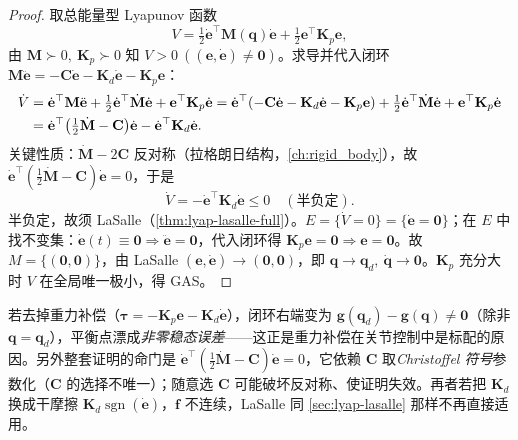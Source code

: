 \begin{proof}
取总能量型 Lyapunov 函数
\begin{equation}
  V=\tfrac12\dot{\mathbf{e}}^\top\mathbf{M}(\mathbf{q})\dot{\mathbf{e}}+\tfrac12\mathbf{e}^\top\mathbf{K}_p\mathbf{e},
  \label{eq:lyap-pd-V}
\end{equation}
由 $\mathbf{M}\succ0,\ \mathbf{K}_p\succ0$ 知 $V>0\ ((\mathbf{e},\dot{\mathbf{e}})\neq\mathbf{0})$。求导并代入闭环 $\mathbf{M}\ddot{\mathbf{e}}=-\mathbf{C}\dot{\mathbf{e}}-\mathbf{K}_d\dot{\mathbf{e}}-\mathbf{K}_p\mathbf{e}$：
\begin{align}
  \dot V&=\dot{\mathbf{e}}^\top\mathbf{M}\ddot{\mathbf{e}}+\tfrac12\dot{\mathbf{e}}^\top\dot{\mathbf{M}}\dot{\mathbf{e}}+\mathbf{e}^\top\mathbf{K}_p\dot{\mathbf{e}}
   =\dot{\mathbf{e}}^\top(-\mathbf{C}\dot{\mathbf{e}}-\mathbf{K}_d\dot{\mathbf{e}}-\mathbf{K}_p\mathbf{e})+\tfrac12\dot{\mathbf{e}}^\top\dot{\mathbf{M}}\dot{\mathbf{e}}+\mathbf{e}^\top\mathbf{K}_p\dot{\mathbf{e}}\notag\\
  &=\dot{\mathbf{e}}^\top\big(\tfrac12\dot{\mathbf{M}}-\mathbf{C}\big)\dot{\mathbf{e}}-\dot{\mathbf{e}}^\top\mathbf{K}_d\dot{\mathbf{e}}.
  \label{eq:lyap-pd-Vdot}
\end{align}
关键性质：$\dot{\mathbf{M}}-2\mathbf{C}$ 反对称（拉格朗日结构，\cref{ch:rigid_body}），故 $\dot{\mathbf{e}}^\top(\tfrac12\dot{\mathbf{M}}-\mathbf{C})\dot{\mathbf{e}}=0$，于是
\begin{equation}
  \dot V=-\dot{\mathbf{e}}^\top\mathbf{K}_d\dot{\mathbf{e}}\le0\quad(\text{半负定}).
  \label{eq:lyap-pd-Vdot-final}
\end{equation}
半负定，故须 LaSalle（\cref{thm:lyap-lasalle-full}）。$E=\{\dot V=0\}=\{\dot{\mathbf{e}}=\mathbf{0}\}$；在 $E$ 中找不变集：$\dot{\mathbf{e}}(t)\equiv\mathbf{0}\Rightarrow\ddot{\mathbf{e}}=\mathbf{0}$，代入闭环得 $\mathbf{K}_p\mathbf{e}=\mathbf{0}\Rightarrow\mathbf{e}=\mathbf{0}$。故 $M=\{(\mathbf{0},\mathbf{0})\}$，由 LaSalle $(\mathbf{e},\dot{\mathbf{e}})\to(\mathbf{0},\mathbf{0})$，即 $\mathbf{q}\to\mathbf{q}_d,\ \dot{\mathbf{q}}\to\mathbf{0}$。$\mathbf{K}_p$ 充分大时 $V$ 在全局唯一极小，得 GAS。
\end{proof}

\begin{pitfall}
若去掉重力补偿（$\boldsymbol{\tau}=-\mathbf{K}_p\mathbf{e}-\mathbf{K}_d\dot{\mathbf{e}}$），闭环右端变为 $\mathbf{g}(\mathbf{q}_d)-\mathbf{g}(\mathbf{q})\neq\mathbf{0}$（除非 $\mathbf{q}=\mathbf{q}_d$），平衡点漂成\emph{非零稳态误差}——这正是重力补偿在关节控制中是标配的原因。另外整套证明的命门是 $\dot{\mathbf{e}}^\top(\tfrac12\dot{\mathbf{M}}-\mathbf{C})\dot{\mathbf{e}}=0$，它依赖 $\mathbf{C}$ 取\emph{Christoffel 符号}参数化（$\mathbf{C}$ 的选择不唯一）；随意选 $\mathbf{C}$ 可能破坏反对称、使证明失效。再者若把 $\mathbf{K}_d$ 换成干摩擦 $\mathbf{K}_d\operatorname{sgn}(\dot{\mathbf{e}})$，$\mathbf{f}$ 不连续，LaSalle 同 \cref{sec:lyap-lasalle} 那样不再直接适用。
\end{pitfall}

